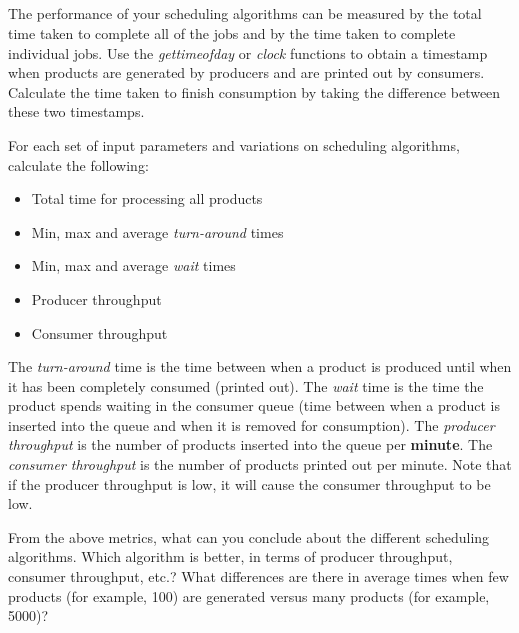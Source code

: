 \documentclass[11pt, letterpaper]{article}
\begin{document}
\\
\\
\noindent{\today}\\
\\

\bigskip
{}

The performance of your scheduling algorithms can be measured by the total time taken to complete all of the jobs and by the time taken to complete individual jobs. Use the \textit{gettimeofday} or \textit{clock} functions to obtain a timestamp when products are generated by producers and are printed out by consumers. Calculate the time taken to finish consumption by taking the difference between these two timestamps.

For each set of input parameters and variations on scheduling algorithms, calculate the following:
\begin{itemize}
    \item Total time for processing all products
    \item Min, max and average \textit{turn-around} times
    \item Min, max and average \textit{wait} times
    \item Producer throughput
    \item Consumer throughput
\end{itemize}

The \textit{turn-around} time is the time between when a product is produced until when it has been completely consumed (printed out). The \textit{wait} time is the time the product spends waiting in the consumer queue (time between when a product is inserted into the queue and when it is removed for consumption). The \textit{producer throughput} is the number of products inserted into the queue per \textbf{minute}. The \textit{consumer throughput} is the number of products printed out per minute. Note that if the producer throughput is low, it will cause the consumer throughput to be low.

From the above metrics, what can you conclude about the different scheduling algorithms. Which algorithm is better, in terms of producer throughput, consumer throughput, etc.? What differences are there in average times when few products (for example, 100) are generated versus many products (for example, 5000)?
\end{document}
